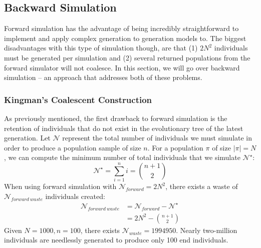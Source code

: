
\subsection{Backward Simulation}\label{subsec:bs}
Forward simulation has the advantage of being incredibly straightforward to implement and apply complex generation to
generation models to.
The biggest disadvantages with this type of simulation though, are that (1) $2N^2$ individuals must
be generated per simulation and (2) several returned populations from the forward simulator will not coalesce.
In this section, we will go over backward simulation -- an approach that addresses both of these problems.

\subsubsection{Kingman's Coalescent Construction}
As previously mentioned, the first drawback to forward simulation is the retention of individuals that do not exist in
the evolutionary tree of the latest generation.
Let $\mathcal{N}$ represent the total number of individuals we must simulate in order to produce a population sample of
size $n$.
For a population $\pi$ of size $|\pi| = N$, we can compute the minimum number of total individuals that we simulate
$\mathcal{N}^\star$:
\begin{equation}
    \mathcal{N}^\star = \sum_{i=1}^n i = \binom{n + 1}{2}
\end{equation}
When using forward simulation with $\mathcal{N}_{forward} = 2N^2$, there exists a waste of
$\mathcal{N}_{{forward \ waste}}$ individuals created:
\begin{equation}
    \begin{aligned}
        \mathcal{N}_{{forward \ waste}} &= \mathcal{N}_{forward} - \mathcal{N}^\star \\
        &= 2N^2 - \binom{n + 1}{2}
    \end{aligned}
\end{equation}
Given $N = 1000, n = 100$, there exists $\mathcal{N}_{waste} = 1994950$.
Nearly two-million individuals are needlessly generated to produce only 100 end individuals.

